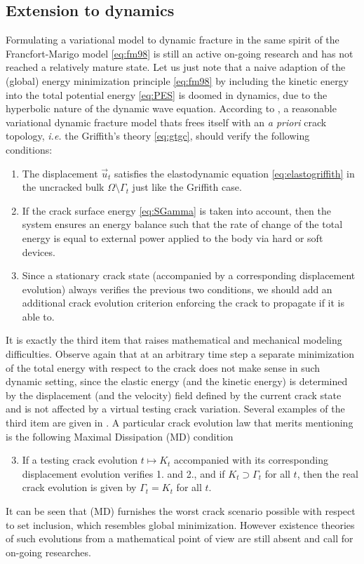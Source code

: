 \subsection{Extension to dynamics}
Formulating a variational model to dynamic fracture in the same spirit of the Francfort-Marigo model \eqref{eq:fm98} is still an active on-going research and has not reached a relatively mature state. Let us just note that a naive adaption of the (global) energy minimization principle \eqref{eq:fm98} by including the kinetic energy into the total potential energy \eqref{eq:PES} is doomed in dynamics, due to the hyperbolic nature of the dynamic wave equation. According to \cite{Larsen:2010}, a reasonable variational dynamic fracture model thats frees itself with an \emph{a priori} crack topology, \emph{i.e.} the Griffith's theory \eqref{eq:gtgc}, should verify the following conditions:
\begin{enumerate}
\item The displacement $\vec{u}_t$ satisfies the elastodynamic equation \eqref{eq:elastogriffith} in the uncracked bulk $\Omega\setminus\Gamma_t$ just like the Griffith case.

\item If the crack surface energy \eqref{eq:SGamma} is taken into account, then the system ensures an energy balance such that the rate of change of the total energy is equal to external power applied to the body via hard or soft devices.

\item Since a stationary crack state (accompanied by a corresponding displacement evolution) always verifies the previous two conditions, we should add an additional crack evolution criterion enforcing the crack to propagate if it is able to.
\end{enumerate}

It is exactly the third item that raises mathematical and mechanical modeling difficulties. Observe again that at an arbitrary time step a separate minimization of the total energy with respect to the crack does not make sense in such dynamic setting, since the elastic energy (and the kinetic energy) is determined by the displacement (and the velocity) field defined by the current crack state and is not affected by a virtual testing crack variation. Several examples of the third item are given in \cite{Larsen:2010}. A particular crack evolution law that merits mentioning is the following Maximal Dissipation (MD) condition
\begin{enumerate}
\setcounter{enumi}{2}
\item If a testing crack evolution $t\mapsto K_t$ accompanied with its corresponding displacement evolution verifies 1. and 2., and if $K_t\supset\Gamma_t$ for all $t$, then the real crack evolution is given by $\Gamma_t=K_t$ for all $t$.
\end{enumerate}
It can be seen that (MD) furnishes the worst crack scenario possible with respect to set inclusion, which resembles global minimization. However existence theories of such evolutions from a mathematical point of view are still absent and call for on-going researches.

